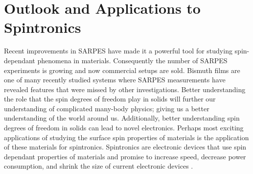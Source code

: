 \documentclass[12pt]{article}
\begin{document}
\section{Outlook and Applications to Spintronics}
Recent improvements in SARPES have made it a powerful tool for studying spin-dependant phenomena in materials.
Consequently the number of SARPES experiments is growing and now commercial setups are sold.
Bismuth films are one of many recently studied systems where SARPES measurements have revealed features that were missed by other investigations.
Better understanding the role that the spin degrees of freedom play in solids will further our understanding of complicated many-body physics; giving us a better understanding of the world around us.
Additionally, better understanding spin degrees of freedom in solids can lead to novel electronics.
Perhaps most exciting applications of studying the surface spin properties of materials is the application of these materials for spintronics.
Spintronics are electronic devices that use spin dependant properties of materials and promise to increase speed, decrease power consumption, and shrink the size of current electronic devices \cite{wolf}.

\printbibliography
\end{document}
